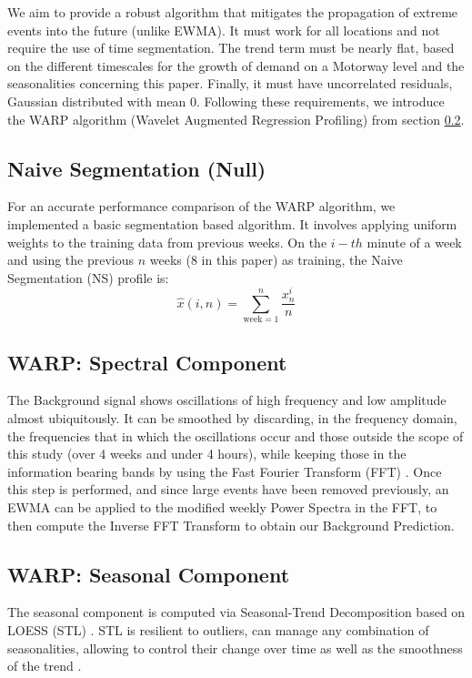 \documentclass[a4paper, 10pt, conference]{ieeeconf}      %
\begin{document}
We aim to provide a robust algorithm that mitigates the propagation of extreme events into the future (unlike EWMA). 
It must work for all locations and not require the use of time segmentation. The trend term must be nearly flat, based on the different timescales for the growth of demand on a Motorway level and the seasonalities concerning this paper. 
Finally, it must have uncorrelated residuals, Gaussian distributed with mean 0.
Following these requirements, we introduce the WARP algorithm (Wavelet Augmented Regression Profiling) from section \ref{algostart}.
\subsection{Naive Segmentation (Null)}
For an accurate performance comparison of the WARP algorithm, we implemented a basic segmentation based algorithm. 
It involves applying uniform weights to the training data from previous weeks. 
On the $i-th$ minute of a week and using the previous $n$ weeks (8 in this paper) as training, the Naive Segmentation (NS) profile is:
\begin{equation}
\hat{x}(i,n) = \sum_{\textrm{week}=1}^{n} \frac{x^i_n}{n} 
\end{equation}

\subsection{WARP: Spectral Component}
\label{algostart}
The Background signal shows oscillations of high frequency and low amplitude almost ubiquitously. 
It can be smoothed by discarding, in the frequency domain, the frequencies that in which the oscillations occur and those outside the scope of this study (over 4 weeks and under 4 hours), while keeping those in the information bearing bands by using the Fast Fourier Transform (FFT) \cite{FFT}.
Once this step is performed, and since large events have been removed previously, an EWMA can be applied to the modified weekly Power Spectra in the FFT, to then compute the Inverse FFT Transform to obtain our Background Prediction.
\subsection{WARP: Seasonal Component}
The seasonal component is computed via Seasonal-Trend Decomposition based on LOESS (STL) \cite{STL}.
STL is resilient to outliers, can manage any combination of seasonalities, allowing to control their change over time as well as the smoothness of the trend \cite{forecasting}.
\end{document}

